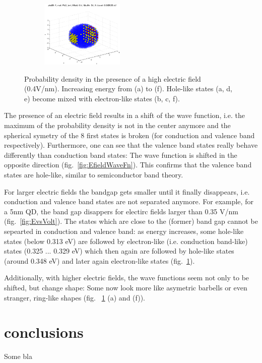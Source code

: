 \begin{figure}
\begin{subfigure}{150px}
		\caption{}
	\end{subfigure}
	\begin{subfigure}{150px}
		\includegraphics[width=150px]{Fig/Plots/r25v04Mod34}
		\caption{}
	\end{subfigure}
	\caption{Probability density in the presence of a high electric field (0.4V/nm). Increasing energy from (a) to (f). Hole-like states (a, d, e) become mixed with electron-like states (b, c, f).}
	\label{fig:HighEfieldWaveFn}
\end{figure}
%
The presence of an electric field results in a shift of the wave function, i.e. the maximum of the probability density is not in the center anymore and the spherical symetry of the 8 first states is broken (for conduction and valence band respectively). Furthermore, one can see that the valence band states really behave differently than conduction band states: The wave function is shifted in the opposite direction (fig.~\ref{fig:EfieldWaveFn}). This confirms that the valence band states are hole-like, similar to semiconductor band theory. 
	
For larger electric fields the bandgap gets smaller until it finally disappears, i.e. conduction and valence band states are not separated anymore. For example, for a 5nm  QD, the band gap disappers for electirc fields larger than 0.35 V/nm (fig.~\ref{fig:EvsVolt}). The states which are close to the (former) band gap cannot be sepearted in conduction and valence band: as energy increases, some hole-like states (below 0.313 eV) are followed by electron-like (i.e. conduction band-like) states (0.325 ... 0.329 eV) which then again are followed by hole-like states (around 0.348 eV) and later again electron-like states (fig.~\ref{fig:HighEfieldWaveFn}).
	
Additionally, with higher electric fields, the wave functions seem not only to be shifted, but change shape: Some now look more like asymetric barbells or even stranger, ring-like shapes (fig. ~\ref{fig:HighEfieldWaveFn} (a) and (f)).

\FloatBarrier
\section{conclusions}
Some bla